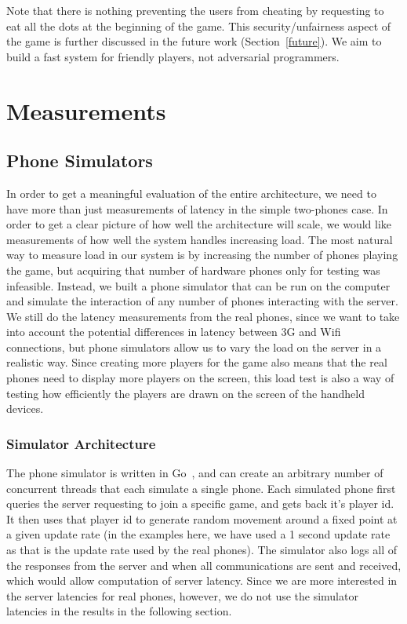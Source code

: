\documentclass{acm_proc_article-sp}
\begin{document}
Note that there is nothing preventing the users from cheating by
requesting to eat all the dots at the beginning of the game. This
security/unfairness aspect of the game is further discussed in the
future work (Section~\ref{future}). We aim to build a fast system for
friendly players, not adversarial programmers.

\section{Measurements}
\subsection{Phone Simulators}
In order to get a meaningful evaluation of the entire architecture, we
need to have more than just measurements of latency in the simple
two-phones case.  In order to get a clear picture of how well the
architecture will scale, we would like measurements of how well the
system handles increasing load.  The most natural way to measure load
in our system is by increasing the number of phones playing the game,
but acquiring that number of hardware phones only for testing was
infeasible.  Instead, we built a phone simulator that can be run on
the computer and simulate the interaction of any number of phones
interacting with the server. We still do the latency measurements from
the real phones, since we want to take into account the potential
differences in latency between 3G and Wifi connections, but phone
simulators allow us to vary the load on the server in a realistic
way. Since creating more players for the game also means that the real
phones need to display more players on the screen, this load test is
also a way of testing how efficiently the players are drawn on the
screen of the handheld devices.

\subsubsection{Simulator Architecture}
The phone simulator is written in Go~\cite{GoLang}, and can create an arbitrary
number of concurrent threads that each simulate a single phone.  Each
simulated phone first queries the server requesting to join a specific
game, and gets back it's player id.  It then uses that player id to
generate random movement around a fixed point at a given update rate
(in the examples here, we have used a 1 second update rate as that is
the update rate used by the real phones). The simulator also logs all
of the responses from the server and when all communications are sent
and received, which would allow computation of server latency.  Since
we are more interested in the server latencies for real phones,
however, we do not use the simulator latencies in the results in the
following section.
\end{document}
